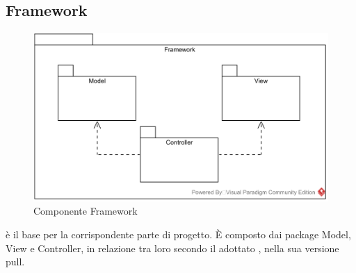 \subsection{Framework} \label{framework}
\begin{figure}[H]
	\centering
	\includegraphics[width=15cm]{./diagrammi/framework.png}
	\caption{Componente Framework}
\end{figure}
 è il  base per la corrispondente parte di progetto. È composto dai package Model, View e Controller, in relazione tra loro secondo il  adottato , nella sua versione pull.

\subsubsection[::Model]{\class} \label{\class}

%
%
%
%

